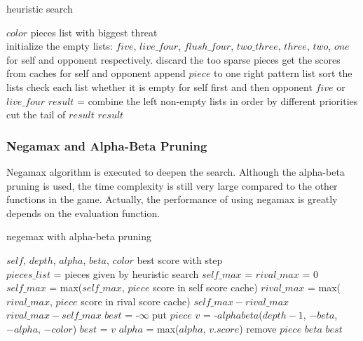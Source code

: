 \documentclass[9pt,shortpaper,twoside,web]{ieeecolor}
\begin{document}
\begin{algorithm}
 \caption{heuristic search}
 \begin{algorithmic}[h]
 \renewcommand{\algorithmicrequire}{\textbf{Input:}}
 \renewcommand{\algorithmicensure}{\textbf{Output:}}
 \REQUIRE $color$
 \ENSURE  pieces list with biggest threat\\
 \STATE initialize the empty lists: $five$, $live\_four$, $flush\_four$, $two\_three$, $three$, $two$, $one$ for self and opponent respectively.
 \STATE discard the too sparse pieces 
 \STATE get the scores from caches for self and opponent
 \STATE append $piece$ to one right pattern list
 \ENDFOR
 \STATE sort the lists
 \STATE check each list whether it is empty for self first and then opponent
 \RETURN $five$ or $live\_four$
 \ENDIF
 \STATE $result$ = combine the left non-empty lists in order by different priorities
 \STATE cut the tail of $result$ 
 \ENDIF
 \RETURN $result$
 \end{algorithmic} 
 \end{algorithm}

\subsubsection{Negamax and Alpha-Beta Pruning}
Negamax algorithm is executed to deepen the search. Although the alpha-beta pruning is used, the time complexity is still very large compared to the other functions in the game. Actually, the performance of using negamax is greatly depends on the evaluation function.  

\begin{algorithm}
 \caption{negemax with alpha-beta pruning}
 \begin{algorithmic}[h]
 \renewcommand{\algorithmicrequire}{\textbf{Input:}}
 \renewcommand{\algorithmicensure}{\textbf{Output:}}
 \REQUIRE $self$, $depth$, $alpha$, $beta$, $color$
 \ENSURE  best score with step\\
  \STATE $pieces\_list$ = pieces given by heuristic search
  \STATE$self\_max$ = $rival\_max$ = $0$\\ 
  \STATE $self\_max$ = max($self\_max$, $piece$ score in self score cache)
  \STATE $rival\_max$ = max($rival\_max$, $piece$ score in rival score cache)
  \ENDFOR
  \RETURN $self\_max - rival\_max$
  \ELSE
  \RETURN $rival\_max - self\_max$
  \ENDIF
  \ENDIF  
  \STATE $best$ = -$\infty$
  \STATE put $piece$
  \STATE $v$ = -$alphabeta$($depth-1$, $-beta$, $-alpha$, $-color$)
  \STATE $best$ = $v$
  \ENDIF
  \STATE $alpha$ = max($alpha$, $v.score$)
  \STATE remove $piece$
  \RETURN $beta$
  \ENDIF
  \ENDFOR
 \RETURN $best$ 
 \end{algorithmic} 
 \end{algorithm}
\end{document}
